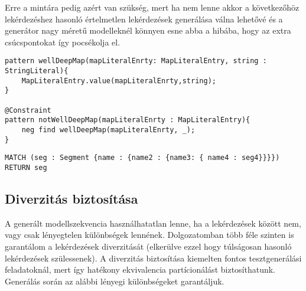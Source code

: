 Erre a mintára pedig azért van szükség, mert ha nem lenne akkor a következőhöz lekérdezéshez hasonló értelmetlen lekérdezések generálása válna lehetővé és a generátor nagy méretű modelleknél könnyen esne abba a hibába, hogy az extra csúcspontokat így pocsékolja el.


\begin{lstlisting}[style=viatrasmall]
pattern wellDeepMap(mapLiteralEnrty: MapLiteralEntry, string : StringLiteral){
	MapLiteralEntry.value(mapLiteralEnrty,string);
}

@Constraint
pattern notWellDeepMap(mapLiteralEnrty : MapLiteralEntry){
	neg find wellDeepMap(mapLiteralEnrty, _);
}
\end{lstlisting}



\begin{lstlisting}[style=cyphersmall]
MATCH (seg : Segment {name : {name2 : {name3: { name4 : seg4}}}}) 
RETURN seg
\end{lstlisting}



\subsection{Diverzitás biztosítása}
A generált modellszekvencia használhatatlan lenne, ha a lekérdezések között nem, vagy csak lényegtelen különbségek lennének. Dolgozatomban több féle szinten is garantálom a lekérdezések diverzitását (elkerülve ezzel hogy túlságosan hasonló lekérdezések szülessenek). A diverzitás biztosítása kiemelten fontos tesztgenerálási feladatoknál, mert így hatékony ekvivalencia partícionálást biztosíthatunk. Generálás során az alábbi lényegi különbségeket garantáljuk.

